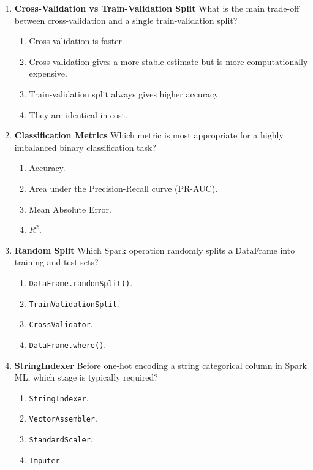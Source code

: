 \documentclass{article}
\begin{document}
\begin{enumerate}[label=\textbf{Q\arabic*.}]
		\item \textbf{Cross-Validation vs Train-Validation Split}
		What is the main trade-off between cross-validation and a single train-validation split?
		\begin{enumerate}[label=\Alph*.]
			\item Cross-validation is faster.
			\item Cross-validation gives a more stable estimate but is more computationally expensive.
			\item Train-validation split always gives higher accuracy.
			\item They are identical in cost.
		\end{enumerate}
		
		\item \textbf{Classification Metrics}
		Which metric is most appropriate for a highly imbalanced binary classification task?
		\begin{enumerate}[label=\Alph*.]
			\item Accuracy.
			\item Area under the Precision-Recall curve (PR-AUC).
			\item Mean Absolute Error.
			\item $R^2$.
		\end{enumerate}
		
		\item \textbf{Random Split}
		Which Spark operation randomly splits a DataFrame into training and test sets?
		\begin{enumerate}[label=\Alph*.]
			\item \texttt{DataFrame.randomSplit()}.
			\item \texttt{TrainValidationSplit}.
			\item \texttt{CrossValidator}.
			\item \texttt{DataFrame.where()}.
		\end{enumerate}
		
		\item \textbf{StringIndexer}
		Before one-hot encoding a string categorical column in Spark ML, which stage is typically required?
		\begin{enumerate}[label=\Alph*.]
			\item \texttt{StringIndexer}.
			\item \texttt{VectorAssembler}.
			\item \texttt{StandardScaler}.
			\item \texttt{Imputer}.
		\end{enumerate}
		

\end{enumerate}
\end{document}
